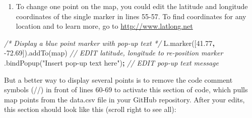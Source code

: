 \documentclass[
  english,
]{book}
\newenvironment{Shaded}{\begin{snugshade}}{\end{snugshade}}
\newcommand{\AttributeTok}[1]{\textcolor[rgb]{0.77,0.63,0.00}{#1}}
\newcommand{\CommentTok}[1]{\textcolor[rgb]{0.56,0.35,0.01}{\textit{#1}}}
\newcommand{\FloatTok}[1]{\textcolor[rgb]{0.00,0.00,0.81}{#1}}
\newcommand{\NormalTok}[1]{#1}
\newcommand{\OperatorTok}[1]{\textcolor[rgb]{0.81,0.36,0.00}{\textbf{#1}}}
\newcommand{\StringTok}[1]{\textcolor[rgb]{0.31,0.60,0.02}{#1}}
\newcommand{\VariableTok}[1]{\textcolor[rgb]{0.00,0.00,0.00}{#1}}
\providecommand{\tightlist}{%
  \setlength{\itemsep}{0pt}\setlength{\parskip}{0pt}}
\begin{document}
\begin{enumerate}
\def\labelenumi{\arabic{enumi})}
\setcounter{enumi}{16}
\tightlist
\item
  To change one point on the map, you could edit the latitude and longitude coordinates of the single marker in lines 55-57. To find coordinates for any location and to learn more, go to \url{http://www.latlong.net}
\end{enumerate}

\begin{Shaded}
\begin{Highlighting}[]
\CommentTok{/* Display a blue point marker with pop{-}up text */}
\VariableTok{L}\NormalTok{.}\AttributeTok{marker}\NormalTok{([}\FloatTok{41.77}\OperatorTok{,} \FloatTok{{-}72.69}\NormalTok{]).}\AttributeTok{addTo}\NormalTok{(map) }\CommentTok{// EDIT latitude, longitude to re{-}position marker}
\NormalTok{.}\AttributeTok{bindPopup}\NormalTok{(}\StringTok{"Insert pop{-}up text here"}\NormalTok{)}\OperatorTok{;} \CommentTok{// EDIT pop{-}up text message}
\end{Highlighting}
\end{Shaded}

But a better way to display several points is to remove the code comment symbols (//) in front of lines 60-69 to activate this section of code, which pulls map points from the data.csv file in your GitHub repository. After your edits, this section should look like this (scroll right to see all):
\end{document}
